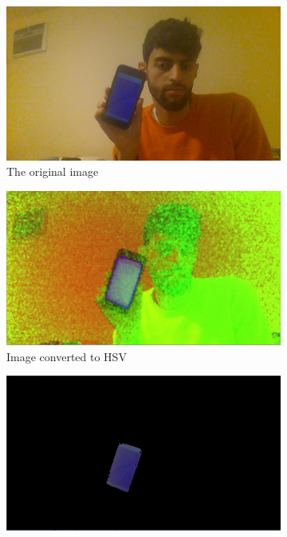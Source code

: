 \documentclass[titlepage, 12pt]{scrartcl}
\begin{document}
    \begin{figure}[h!]
        \centering
        \begin{subfigure}[b]{0.4\linewidth}
            \includegraphics[width=\linewidth]{figures/Capture5.PNG}
            \caption{The original image}
        \end{subfigure}
        \begin{subfigure}[b]{0.4\linewidth}
            \includegraphics[width=\linewidth]{figures/Capture4.PNG}
            \caption{Image converted to HSV}
        \end{subfigure}
        \begin{subfigure}[b]{0.4\linewidth}
            \includegraphics[width=\linewidth]{figures/Capture3.PNG}

\end{subfigure}
\end{figure}
\end{document}
